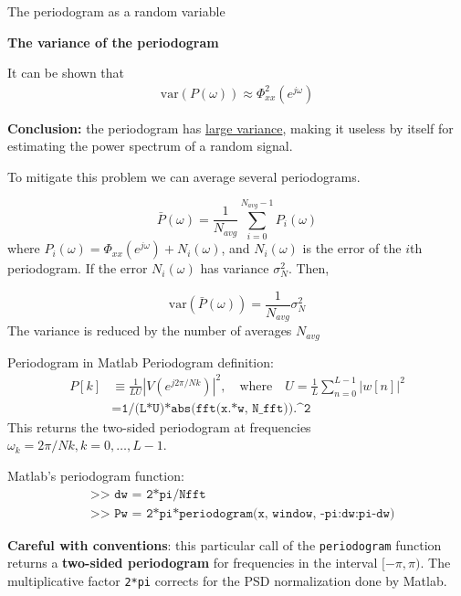 \documentclass[10pt]{beamer}
\begin{document}
\begin{frame}{The periodogram as a random variable}

\textbf{The variance of the periodogram}

It can be shown that
\begin{align*}
	\mathrm{var}(P(\omega)) \approx \Phi_{xx}^2(e^{j\omega})
\end{align*}

\vspace{-0.25cm}
\textbf{Conclusion:} the periodogram has \underline{large variance}, making it useless by itself for estimating the power spectrum of a random signal.

\vspace{0.25cm}
To mitigate this problem we can average several periodograms. 

\begin{equation*}
\bar{P}(\omega) = \frac{1}{N_{avg}}\sum_{i = 0}^{N_{avg}-1} P_i(\omega)
\end{equation*}
where $P_i(\omega) = \Phi_{xx}(e^{j\omega}) + N_i(\omega)$, and $N_i(\omega)$ is the error of the $i$th periodogram. If the error $N_i(\omega)$ has variance $\sigma_N^2$. Then,

\begin{equation*}
	\mathrm{var}(\bar{P}(\omega)) = \frac{1}{N_{avg}}\sigma_N^2
\end{equation*}
The variance is reduced by the number of averages $N_{avg}$

\end{frame}

\begin{frame}{Periodogram in Matlab}
Periodogram definition:
\begin{align*}
P[k] &\equiv \frac{1}{LU}|V(e^{j2\pi/Nk})|^2, \quad\text{where}\quad U = \frac{1}{L}\sum_{n = 0}^{L-1}|w[n]|^2 \\
&= \texttt{1/(L*U)*abs(fft(x.*w, N\_{fft})).\textasciicircum 2} \tag{Matlab code}
\end{align*}
This returns the two-sided periodogram at frequencies $\omega_k = 2\pi/Nk, k=0, \ldots, L-1$.

Matlab's periodogram function:
\begin{align*}
&\texttt{>> dw = 2*pi/Nfft} \\
&\texttt{>> Pw = 2*pi*periodogram(x, window, -pi:dw:pi-dw)}
\end{align*}

\textbf{Careful with conventions}: this particular call of the \texttt{periodogram} function returns a \textbf{two-sided periodogram} for frequencies in the interval $[-\pi, \pi)$. The multiplicative factor \texttt{2*pi} corrects for the PSD normalization done by Matlab.
\end{frame}
\end{document}
